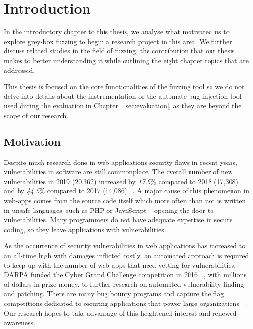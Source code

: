 \chapter{Introduction}
\minitoc
\vspace*{1cm}

In the introductory chapter to this thesis, we analyse what motivated us to explore grey-box fuzzing to begin a research project in this area. We further discuss related studies in the field of fuzzing, the contribution that our thesis makes to better understanding it while outlining the eight chapter topics that are addressed.

This thesis is focused on the core functionalities of the fuzzing tool so we do not delve into details about the instrumentation or the automate bug injection tool used during the evaluation in Chapter ~\ref{sec:evaluation}, as they are beyond the scope of our research.

\section{Motivation}

Despite much research done in web applications security flaws in recent years, vulnerabilities in software are still commonplace. The overall number of new vulnerabilities in 2019 (20,362) increased by \emph{17.6}\% compared to 2018 (17,308) and by \emph{44.5}\% compared to 2017 (14,086) ~\cite{vulnerabilities2019state,owasp2017}. A major cause of this phenomenon in web-apps comes from the source code itself which more often than not is written in unsafe languages, such as PHP or JavaScript ~\cite{vulnerabilities2019state} opening the door to vulnerabilities. Many programmers do not have adequate expertise in secure coding, so they leave applications with vulnerabilities. 

As the occurrence of security vulnerabilities in web applications has increased to an all-time high with damages inflicted costly, an automated approach is required to keep up with the number of web-apps that need vetting for vulnerabilities. DARPA funded the Cyber Grand Challenge competition in 2016 ~\cite{darpa2016cgc}, with millions of dollars in prize money, to further research on automated vulnerability finding and patching. There are many bug bounty programs and capture the flag competitions dedicated to securing applications that power large organizations ~\cite{bugbounty}. Our research hopes to take advantage of this heightened interest and renewed awareness.

